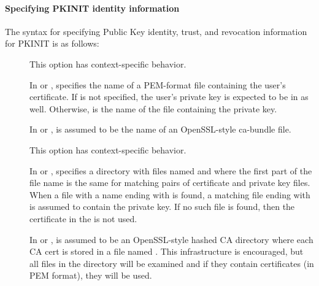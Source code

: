 \documentclass[letterpaper,10pt,english]{sphinxmanual}
\begin{document}
\paragraph{Specifying PKINIT identity information}
\label{\detokenize{admin/conf_files/krb5_conf:specifying-pkinit-identity-information}}\label{\detokenize{admin/conf_files/krb5_conf:pkinit-identity}}
The syntax for specifying Public Key identity, trust, and revocation
information for PKINIT is as follows:
\begin{description}
\item[{\sphinxstyleemphasis{filename}{[}\sphinxstylestrong{,}\sphinxstyleemphasis{keyfilename}{]}}] \leavevmode
This option has context-specific behavior.

In  or , 
specifies the name of a PEM-format file containing the user’s
certificate.  If  is not specified, the user’s
private key is expected to be in  as well.  Otherwise,
 is the name of the file containing the private key.

In  or ,  is assumed to
be the name of an OpenSSL-style ca-bundle file.

\item[{}] \leavevmode
This option has context-specific behavior.

In  or , 
specifies a directory with files named  and 
where the first part of the file name is the same for matching
pairs of certificate and private key files.  When a file with a
name ending with  is found, a matching file ending with
 is assumed to contain the private key.  If no such file
is found, then the certificate in the  is not used.

In  or ,  is assumed to
be an OpenSSL-style hashed CA directory where each CA cert is
stored in a file named .  This infrastructure
is encouraged, but all files in the directory will be examined and
if they contain certificates (in PEM format), they will be used.


\end{description}
\end{document}
